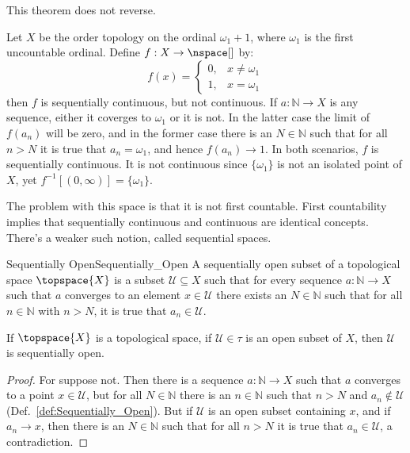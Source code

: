 \documentclass{article}                                                        %
\begin{document}
        This theorem does not reverse.
        \begin{example}
            Let $X$ be the order topology on the ordinal $\omega_{1}+1$, where
            $\omega_{1}$ is the first uncountable ordinal. Define
            $f:X\rightarrow\nspace[]$ by:
            \begin{equation}
                f(x)=
                \begin{cases}
                    0,&x\ne\omega_{1}\\
                    1,&x=\omega_{1}
                \end{cases}
            \end{equation}
            then $f$ is sequentially continuous, but not continuous. If
            $a:\mathbb{N}\rightarrow{X}$ is any sequence, either it coverges to
            $\omega_{1}$ or it is not. In the latter case the limit of
            $f(a_{n})$ will be zero, and in the former case there is an
            $N\in\mathbb{N}$ such that for all $n>N$ it is true that
            $a_{n}=\omega_{1}$, and hence $f(a_{n})\rightarrow{1}$. In both
            scenarios, $f$ is sequentially continuous. It is not continuous
            since $\{\omega_{1}\}$ is not an isolated point of $X$, yet
            $f^{\minus{1}}[(0,\infty)]=\{\omega_{1}\}$.
        \end{example}
        The problem with this space is that it is not first countable. First
        countability implies that sequentially continuous and continuous are
        identical concepts. There's a weaker such notion, called sequential
        spaces.
        \begin{fdefinition}{Sequentially Open}{Sequentially_Open}
            A sequentially open subset of a topological space $\topspace{X}$
            is a subset $\mathcal{U}\subseteq{X}$ such that for every sequence
            $a:\mathbb{N}\rightarrow{X}$ such that $a$ converges to an element
            $x\in\mathcal{U}$ there exists an $N\in\mathbb{N}$ such that for all
            $n\in\mathbb{N}$ with $n>N$, it is true that $a_{n}\in\mathcal{U}$.
        \end{fdefinition}
        \begin{theorem}
            \label{thm:Open_is_Seq_Open}%
            If $\topspace{X}$ is a topological space, if $\mathcal{U}\in\tau$ is
            an open subset of $X$, then $\mathcal{U}$ is sequentially open.
        \end{theorem}
        \begin{proof}
            For suppose not. Then there is a sequence
            $a:\mathbb{N}\rightarrow{X}$ such that $a$ converges to a point
            $x\in\mathcal{U}$, but for all $N\in\mathbb{N}$ there is an
            $n\in\mathbb{N}$ such that $n>N$ and $a_{n}\notin\mathcal{U}$
            (Def.~\ref{def:Sequentially_Open}). But if $\mathcal{U}$ is an open
            subset containing $x$, and if $a_{n}\rightarrow{x}$, then there is
            an $N\in\mathbb{N}$ such that for all $n>N$ it is true that
            $a_{n}\in\mathcal{U}$, a contradiction.
        \end{proof}
\end{document}
